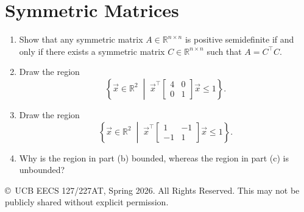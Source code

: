 \documentclass[10pt]{article}
\newcommand{\RR}{\mathbb{R}}
\begin{document}
\newpage

\section{Symmetric Matrices}

\begin{enumerate}[label=(\alph*)]
    \item Show that any symmetric matrix $A \in \RR^{n \times n}$ is positive semidefinite if and only if there exists a symmetric matrix $C \in \RR^{n \times n}$ such that $A = C^\top C$.

    \vspace{4cm}

    \item Draw the region
    \[
        \left\{ \vec{x} \in \RR^2 \;\middle|\; \vec{x}^\top \begin{bmatrix} 4 & 0 \\ 0 & 1 \end{bmatrix} \vec{x} \leq 1 \right\}.
    \]

    \vspace{4cm}

    \item Draw the region
    \[
        \left\{ \vec{x} \in \RR^2 \;\middle|\; \vec{x}^\top \begin{bmatrix} 1 & -1 \\ -1 & 1 \end{bmatrix} \vec{x} \leq 1 \right\}.
    \]

    \vspace{4cm}

    \item Why is the region in part (b) bounded, whereas the region in part (c) is unbounded?

    \vspace{4cm}
\end{enumerate}

\vfill
\noindent\footnotesize{\copyright\ UCB EECS 127/227AT, Spring 2026. All Rights Reserved. This may not be publicly shared without explicit permission.}
\end{document}
